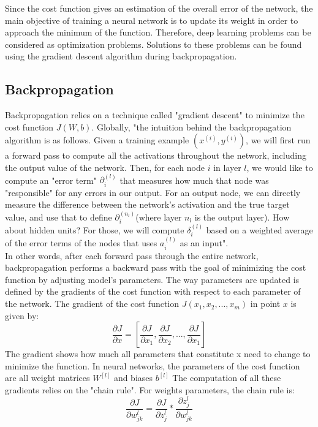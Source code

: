 Since the cost function gives an estimation of the overall error of the network, the main objective of training a neural network is to update its weight in order to approach the minimum of the function. Therefore, deep learning problems can be considered as optimization problems. Solutions to these problems can be found using the gradient descent algorithm during backpropagation.
\subsection{Backpropagation}
Backpropagation relies on a technique called "gradient descent" to minimize the cost function $J(W, b)$. Globally, "the intuition behind the backpropagation algorithm is as follows. Given a training example $(x^{(i)}, y^{(i)})$, we will first run a forward pass to compute all the activations throughout the network, including the output value of the network. Then, for each node $i$ in layer $l$, we would like to compute an "error term" $\partial^{(l)}_{i}$ that measures how much that node was "responsible" for any errors in our output. For an output node, we can directly measure the difference between the network’s activation and the true target value, and use that to define $\partial^{(n_{l})}_{i}$(where layer $n_{l}$ is the output layer). How about hidden units? For those, we will compute $\delta^{(l)}_{i}$ based on a weighted average of the error terms of the nodes that uses $a^{(l)}_{i}$ as an input"\cite{24}.\\
In other words, after each forward pass through the entire network, backpropagation performs a backward pass with the goal of minimizing the cost function by adjusting model's parameters. The way parameters are updated is defined by the gradients of the cost function with respect to each parameter of the network. The gradient of the cost function $J(x_{1}, x_{2}, ..., x_{m})$ in point $x$ is given by:
\begin{equation}
\frac{\partial J}{\partial x} = [\frac{\partial J}{\partial x_{1}}, \frac{\partial J}{\partial x_{2}}, ..., \frac{\partial J}{\partial x_{1}}]
\end{equation}
The gradient shows how much all parameters that constitute x need to change to minimize the function. In neural networks, the parameters of the cost function are all weight matrices $W^{[l]}$ and biases $b^{[l]}$ The computation of all these gradients relies on the "chain rule". For weights parameters, the chain rule is:
\begin{equation}
\frac{\partial J}{\partial w_{jk}^{l}} = \frac{\partial J}{\partial z_{j}^{l}} * \frac{\partial z_{j}^{l}}{\partial w_{jk}^{l}}
\end{equation}
